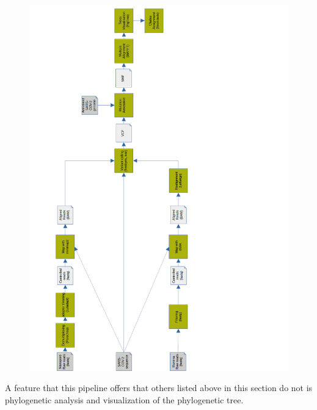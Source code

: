         \begin{figure}[h]
        	\centering
            \includegraphics[width=1\textwidth]{figures/prior/Izquierdo-Lara_vertical.png}
            \label{fig:prior:izquierdo}
        \end{figure}
        
        A feature that this pipeline offers that others listed above in this section do not is phylogenetic analysis and visualization of the phylogenetic tree.


